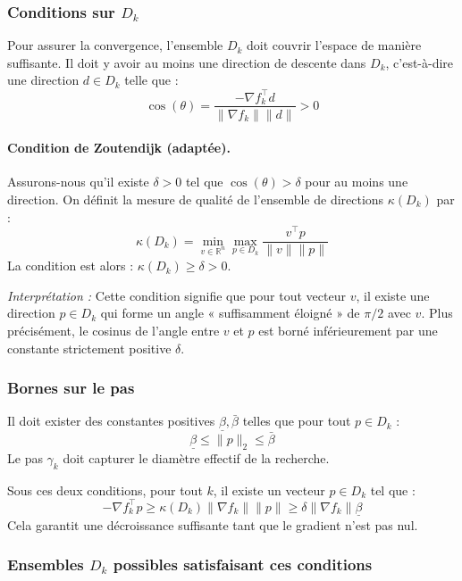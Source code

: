\subsubsection{Conditions sur $D_k$}
Pour assurer la convergence, l'ensemble $D_k$ doit couvrir l'espace de manière suffisante.
Il doit y avoir au moins une direction de descente dans $D_k$, c'est-à-dire une direction $d \in D_k$ telle que :
\[
    \cos(\theta) = \frac{-\nabla f_k^\top d}{\|\nabla f_k\| \|d\|} > 0
\]

\paragraph{Condition de Zoutendijk (adaptée).}
Assurons-nous qu'il existe $\delta > 0$ tel que $\cos(\theta) > \delta$ pour au moins une direction.
On définit la mesure de qualité de l'ensemble de directions $\kappa(D_k)$ par :
\begin{equation}
    \kappa(D_k) = \min_{v \in \mathbb{R}^n} \max_{p \in D_k} \frac{v^\top p}{\|v\| \|p\|}
\end{equation}
La condition est alors : $\kappa(D_k) \ge \delta > 0$.

\textit{Interprétation :} Cette condition signifie que pour tout vecteur $v$, il existe une direction $p \in D_k$ qui forme un angle « suffisamment éloigné » de $\pi/2$ avec $v$. Plus précisément, le cosinus de l'angle entre $v$ et $p$ est borné inférieurement par une constante strictement positive $\delta$.

\subsubsection{Bornes sur le pas}
Il doit exister des constantes positives $\underline{\beta}, \bar{\beta}$ telles que pour tout $p \in D_k$ :
\[
    \underline{\beta} \le \|p\|_2 \le \bar{\beta}
\]
Le pas $\gamma_k$ doit capturer le diamètre effectif de la recherche.

Sous ces deux conditions, pour tout $k$, il existe un vecteur $p \in D_k$ tel que :
\begin{equation}
    -\nabla f_k^\top p \ge \kappa(D_k) \|\nabla f_k\| \|p\| \ge \delta \|\nabla f_k\| \underline{\beta}
\end{equation}
Cela garantit une décroissance suffisante tant que le gradient n'est pas nul.

\subsubsection{Ensembles $D_k$ possibles satisfaisant ces conditions}

